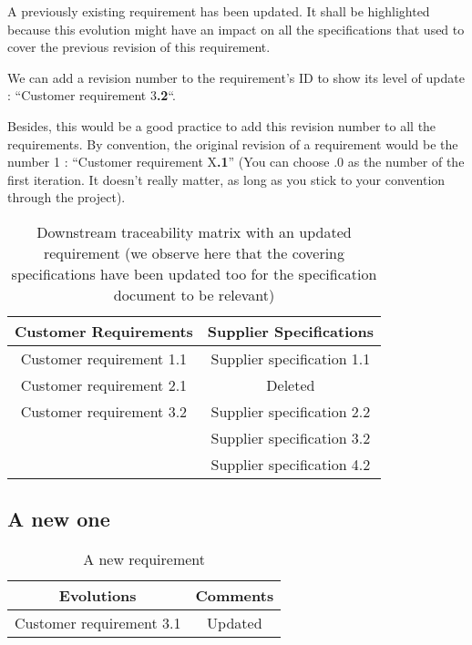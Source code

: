 A previously existing requirement has been updated. It shall be highlighted because this evolution might have an impact on all the specifications that used to cover the previous revision of this requirement.

We can add a revision number to the requirement’s ID to show its level of update : “Customer requirement 3\textbf{.2}“.

Besides, this would be a good practice to add this revision number to all the requirements. By convention, the original revision of a requirement would be the number 1 : “Customer requirement X\textbf{.1}” (You can choose .0 as the number of the first iteration. It doesn’t really matter, as long as you stick to your convention through the project).

\begin{table}
	\centering
		\begin{tabular}{|c|c|}
			\hline
			\textbf{Customer Requirements} & \textbf{Supplier Specifications}\\
            \hline
            Customer requirement 1.1 & Supplier specification 1.1\\
            \hline
            Customer requirement 2.1 & Deleted\\
            \hline
            Customer requirement 3.2 & Supplier specification 2.2\\
            &Supplier specification 3.2\\
            &Supplier specification 4.2\\
            \hline
		\end{tabular}
	\caption{Downstream traceability matrix with an updated requirement (we observe here that the covering specifications have been updated too for the specification document to be relevant)}
	\label{tab:DownstreamTraceabilityMatrixWithUpdatedReq}
\end{table}

\subsection{A new one}

\begin{table}
	\centering
		\begin{tabular}{|c|c|}
			\hline
			\textbf{Evolutions} & \textbf{Comments}\\
            \hline
            Customer requirement 3.1 & Updated\\
            \hline
		\end{tabular}
	\caption{A new requirement}
	\label{tab:New}
\end{table}

